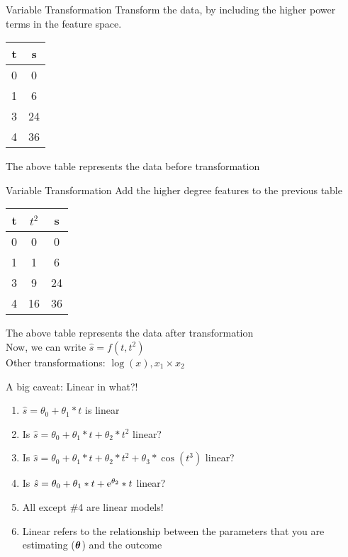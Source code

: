 \documentclass{beamer}
\begin{document}
\begin{frame}{Variable Transformation}
    Transform the data, by including the higher power terms in the feature space. 
    
       
    \begin{center}
 \begin{tabular}{||c c||} 
 \hline
 t  & s \\ [0.5ex] 
 \hline\hline
 0 & 0 \\
 1 & 6 \\
 3 & 24 \\
 4 & 36 \\
 \hline
\end{tabular}
\end{center}

The above table represents the data before transformation
\end{frame}


\begin{frame}{Variable Transformation}
Add the higher degree features to the previous table
    
       
    \begin{center}
 \begin{tabular}{||c c c||} 
 \hline
 t  & $t^{2}$ & s \\ [0.5ex] 
 \hline\hline
 0 & 0&0 \\
 1 & 1&6 \\
 3 & 9&24 \\
 4 & 16&36 \\
 \hline
\end{tabular}
\end{center}

\pause The above table represents the data after transformation \\
\pause Now, we can write $\hat{s}=f(t, t^2)$ \\
\pause Other transformations: $\log(x), x_1\times x_2$
\end{frame}

\begin{frame}{A big caveat: Linear in what?!\footnotemark}
\begin{enumerate}[<+->]
	\item $\hat{s}=\theta_0 + \theta_1*t$
	 is linear
	 \item Is $\hat{s}=\theta_0 + \theta_1*t + \theta_2*t^2$
	 linear?
	 \item Is $\hat{s}=\theta_0 + \theta_1*t + \theta_2*t^2 + \theta_3*\cos(t^3)$
	 linear?
	\item Is $\hat{s}=\theta_0 + \theta_1*t + {\rm e}^{\theta_2}*t$
	linear?
	\item All except \#4 are linear models! 
	\item Linear refers to the relationship between the parameters that you are estimating ($\boldsymbol{\theta}$) and the outcome 
\end{enumerate}
\end{frame}
\end{document}
